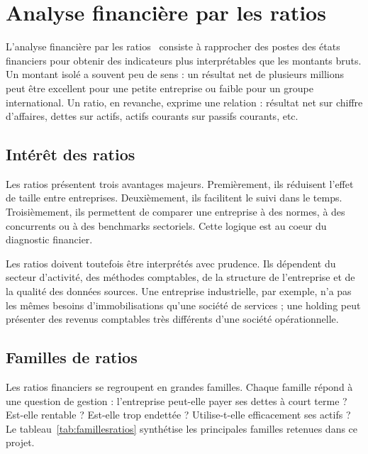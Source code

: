 \section{Analyse financière par les ratios}
\label{sec:ratios}
\par L'analyse financière par les ratios~\cite{vernimmen2022} consiste à
rapprocher des postes des états financiers pour obtenir des indicateurs plus
interprétables que les montants bruts. Un montant isolé a souvent peu de sens :
un résultat net de plusieurs millions peut être excellent pour une petite
entreprise ou faible pour un groupe international. Un ratio, en revanche,
exprime une relation : résultat net sur chiffre d'affaires, dettes sur actifs,
actifs courants sur passifs courants, etc.

\subsection{Intérêt des ratios}
\par Les ratios présentent trois avantages majeurs. Premièrement, ils réduisent
l'effet de taille entre entreprises. Deuxièmement, ils facilitent le suivi dans
le temps. Troisièmement, ils permettent de comparer une entreprise à des normes,
à des concurrents ou à des benchmarks sectoriels. Cette logique est au coeur du
diagnostic financier.

\par Les ratios doivent toutefois être interprétés avec prudence. Ils dépendent
du secteur d'activité, des méthodes comptables, de la structure de l'entreprise
et de la qualité des données sources. Une entreprise industrielle, par exemple,
n'a pas les mêmes besoins d'immobilisations qu'une société de services ; une
holding peut présenter des revenus comptables très différents d'une société
opérationnelle.

\subsection{Familles de ratios}
\par Les ratios financiers se regroupent en grandes familles. Chaque famille
répond à une question de gestion : l'entreprise peut-elle payer ses dettes à
court terme ? Est-elle rentable ? Est-elle trop endettée ? Utilise-t-elle
efficacement ses actifs ? Le tableau~\ref{tab:famillesratios} synthétise les
principales familles retenues dans ce projet.


